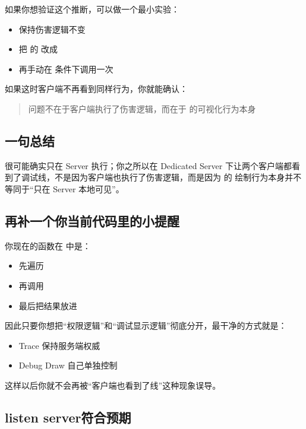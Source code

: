 如果你想验证这个推断，可以做一个最小实验：

\begin{itemize}
	\item 保持伤害逻辑不变
	\item 把  的  改成 
	\item 再手动在  条件下调用一次 
\end{itemize}

如果这时客户端不再看到同样行为，你就能确认：

\begin{quote}
	问题不在于客户端执行了伤害逻辑，而在于  的可视化行为本身
\end{quote}

\subsection{一句总结}

 很可能确实只在 Server 执行；你之所以在 Dedicated Server 下让两个客户端都看到了调试线，不是因为客户端也执行了伤害逻辑，而是因为  的  绘制行为本身并不等同于“只在 Server 本地可见”。

\subsection{再补一个你当前代码里的小提醒}

你现在的函数在  中是：

\begin{itemize}
	\item 先遍历 
	\item 再调用 
	\item 最后把结果放进 
\end{itemize}

因此只要你想把“权限逻辑”和“调试显示逻辑”彻底分开，最干净的方式就是：

\begin{itemize}
	\item Trace 保持服务端权威
	\item Debug Draw 自己单独控制
\end{itemize}

这样以后你就不会再被“客户端也看到了线”这种现象误导。
\subsection{listen server符合预期}

